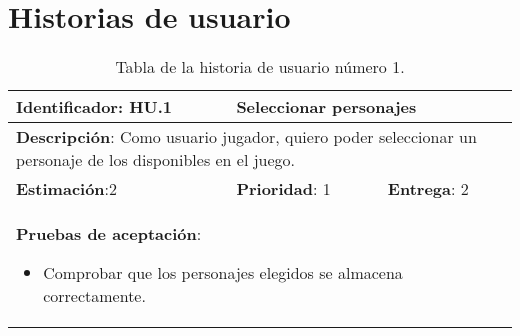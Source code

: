 
\section{Historias de usuario} \label{historias-usuario}

\begin{table}[h]
  \begin{center}
    \begin{tabular}{|p{4cm}|p{4cm}|p{4cm}|}

    \hline
    \textbf{Identificador}: HU.1
    & \multicolumn{2}{p{8cm}|}{Seleccionar personajes}\\

    \hline
    \multicolumn{3}{|p{12cm}|}{\textbf{Descripción}: Como usuario jugador, quiero poder seleccionar un personaje de los disponibles en el juego.}\\

    \hline
    \textbf{Estimación}:2
    & \textbf{Prioridad}: 1
    & \textbf{Entrega}: 2\\

    \hline
    \multicolumn{3}{|p{12cm}|}{\textbf{Pruebas de aceptación}:
      \begin{itemize}
        \item Comprobar que los personajes elegidos se almacena correctamente.
      \end{itemize}
    }\\

    \hline

    \end{tabular}

    \caption{Tabla de la historia de usuario número 1.}
    \label{tabla-hu1}

  \end{center}
\end{table}

